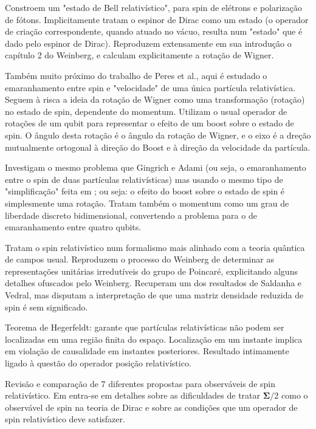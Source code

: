 \documentclass[11pt,a4paper,notitlepage]{article}
\begin{document}
\cite{alsing_milburn_2002} Constroem um "estado de Bell relativístico", para spin de elétrons e polarização de fótons. Implicitamente tratam o espinor de Dirac como um estado (o operador de criação correspondente, quando atuado no vácuo, resulta num "estado" que é dado pelo espinor de Dirac). Reproduzem extensamente em sua introdução o capítulo 2 do Weinberg, e calculam explicitamente a rotação de Wigner. 

\cite{dunningham_palge_vedral_2009} Também muito próximo do trabalho de Peres et al., aqui é estudado o emaranhamento entre spin e "velocidade" de uma única partícula relativística. Seguem à risca a ideia da rotação de Wigner como uma transformação (rotação) no estado de spin, dependente do momentum. Utilizam o usual operador de rotações de um qubit para representar o efeito de um boost sobre o estado de spin. O ângulo desta rotação é o ângulo da rotação de Wigner, e o eixo é a dreção mutualmente ortogonal à direção do Boost e à direção da velocidade da partícula.

\cite{friis_2010} Investigam o mesmo problema que Gingrich e Adami \cite{gingrich_adami_2002} (ou seja, o emaranhamento entre o spin de duas partículas relativísticas) mas usando o mesmo tipo de "simplificação" feita em \cite{dunningham_palge_vedral_2009}; ou seja: o efeito do boost sobre o estado de spin é simplesmente uma rotação. Tratam também o momentum como um grau de liberdade discreto bidimensional, convertendo a problema para o de emaranhamento entre quatro qubits.

\cite{taillebois_avelar_2013} Tratam o spin relativístico num formalismo mais alinhado com a teoria quântica de campos usual. Reproduzem o processo do Weinberg de determinar as representações unitárias irredutíveis do grupo de Poincaré, explicitando alguns detalhes ofuscados pelo Weinberg. Recuperam um dos resultados de Saldanha e Vedral, mas disputam a interpretação de que uma matriz densidade reduzida de spin é sem significado.

\cite{hegerfeldt_1985} Teorema de Hegerfeldt: garante que partículas relativísticas não podem ser localizadas em uma região finita do espaço. Localização em um instante implica em violação de causalidade em instantes posteriores. Resultado intimamente ligado à questão do operador posição relativístico.

\cite{grobe_2014} \cite{grobe_2014_2}  Revisão e comparação de 7 diferentes propostas para observáveis de spin relativístico. Em \cite{grobe_2014_2} entra-se em detalhes sobre as dificuldades de tratar $\mathbf{\Sigma}/2$ como o observável de spin na teoria de Dirac e sobre as condições que um operador de spin relativístico deve satisfazer.
\end{document}

